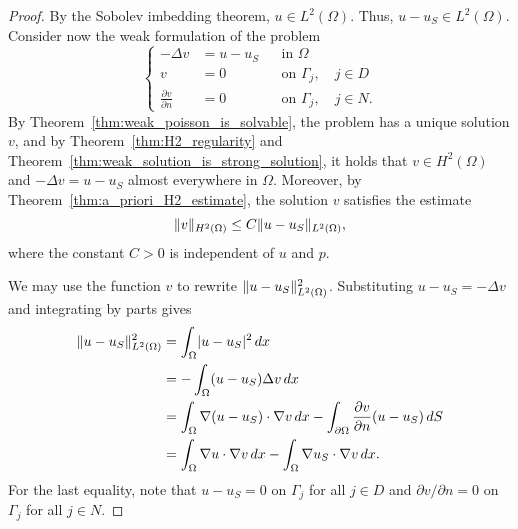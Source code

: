 \documentclass[english, 12pt, a4paper, sci, utf8, a-2b, online]{aaltothesis}
\theoremstyle{definition}
\theoremstyle{plain}
\DeclarePairedDelimiter\abs{\lvert}{\rvert}
\DeclarePairedDelimiter\norm{\lVert}{\rVert}
\newcommand*\diff{\mathop{}\!d}
\numberwithin{equation}{section}
\begin{document}
\begin{proof}
    By the Sobolev imbedding theorem, $u \in L^2(\Omega)$.
    Thus, $u - u_S \in L^2(\Omega)$. Consider now the weak formulation of the problem
    \begin{equation}
        \label{eq:dirac_L2_dual_problem}
        \left\{
            \begin{aligned}
                -\Delta v &= u - u_S && \text{in } \Omega \\
                v &= 0 && \text{on } \Gamma_j, \quad j \in D \\
                \frac{\partial v}{\partial n} &= 0 && \text{on } \Gamma_j,
                \quad j \in N.
            \end{aligned}
        \right.
    \end{equation}
    By Theorem~\ref{thm:weak_poisson_is_solvable}, the problem has a unique solution $v$,
    and by Theorem~\ref{thm:H2_regularity} and Theorem~\ref{thm:weak_solution_is_strong_solution},
    it holds that $v \in H^2(\Omega)$ and $-\Delta v = u-u_S$ almost everywhere in $\Omega$.
    Moreover, by Theorem~\ref{thm:a_priori_H2_estimate}, the solution $v$ satisfies the estimate
    \begin{equation}
        \label{eq:dirac_L2_conv_dual_apriori}
        \norm{v}_{H^2(\Omega)} \leq C \norm{u - u_S}_{L^2(\Omega)},
    \end{equation}
    where the constant $C > 0$ is independent of $u$ and $p$.

    We may use the function $v$ to rewrite $\norm{u - u_S}_{L^2(\Omega)}^2$.
    Substituting $u - u_S = -\Delta v$ and integrating by parts gives
    \begin{align}
        \norm{u - u_S}_{L^2(\Omega)}^2
        &= \int_{\Omega} \abs{u - u_S}^2 \diff x \nonumber \\
        &= -\int_{\Omega} (u - u_S) \Delta v \diff x \nonumber \\
        &= \int_{\Omega} \nabla (u-u_S) \cdot \nabla v \diff x
        - \int_{\partial \Omega} \frac{\partial v}{\partial n} (u - u_S) \diff S
            \nonumber \\
        \label{eq:dirac_L2_first_steps}
        &= \int_{\Omega} \nabla u \cdot \nabla v \diff x
            - \int_{\Omega} \nabla u_S \cdot \nabla v \diff x.
    \end{align}
    For the last equality, note that $u - u_S = 0$ on $\Gamma_j$ for all $j \in D$
    and $\partial v / \partial n = 0$ on $\Gamma_j$ for all $j \in N$.


\end{proof}
\end{document}
